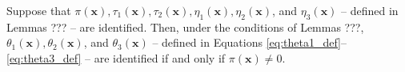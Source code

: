 \begin{cor}
  \label{cor:theta_ident}
  Suppose that $\pi(\mathbf{x}), \tau_1(\mathbf{x}), \tau_2(\mathbf{x}),  \eta_1(\mathbf{x}), \eta_2(\mathbf{x})$, and $\eta_3(\mathbf{x})$ -- defined in Lemmas ??? -- are identified.
  Then, under the conditions of Lemmas ???, $\theta_1(\mathbf{x}), \theta_2(\mathbf{x})$, and $\theta_3(\mathbf{x})$ -- defined in Equations \ref{eq:theta1_def}--\ref{eq:theta3_def} -- are identified if and only if $\pi(\mathbf{x}) \neq 0$.
\end{cor}


\begin{thm}
  \label{thm:main_ident}
\end{thm}
